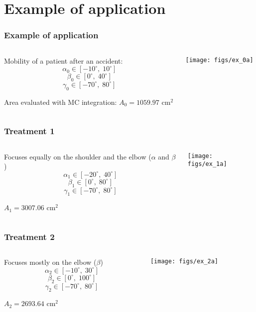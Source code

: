 \documentclass{beamer}
\begin{document}
\section{Example of application}
\begin{frame}
\frametitle{Example of application}

\begin{columns}
\begin{column}{0.55\textwidth}
Mobility of a patient after an accident:
$$
\alpha_0\in [-10^\circ, \; 10^\circ]
$$
$$ \beta_0\in [0^\circ, \; 40^\circ]
$$
$$
 \gamma_0\in [-70^\circ, \; 80^\circ]
$$

\vspace*{0.5cm}
Area evaluated with MC integration:
$A_0=1059.97$ cm$^2$
\end{column}

\begin{column}{0.45\textwidth}
\texttt{[image: figs/ex\_0a]}
\end{column}
\end{columns}

\end{frame}


\begin{frame}
\frametitle{Treatment 1}

\begin{columns}
\begin{column}{0.55\textwidth}
Focuses equally on the shoulder and the elbow ($\alpha$ and $\beta$)
$$
\alpha_1\in [-20^\circ, \; 40^\circ]
$$
$$
 \beta_1\in [0^\circ, \; 80^\circ]
 $$
 $$
  \gamma_1\in [-70^\circ, \; 80^\circ]
$$

\vspace*{0.5cm}
$A_1=3007.06$ cm$^2$
\end{column}

\begin{column}{0.45\textwidth}
\texttt{[image: figs/ex\_1a]}
\end{column}
\end{columns}

\end{frame}


\begin{frame}
\frametitle{Treatment 2}

\begin{columns}
\begin{column}{0.55\textwidth}
Focuses mostly on the elbow ($\beta$)
$$
\alpha_2\in [-10^\circ, \; 30^\circ]
$$
$$
\beta_2\in [0^\circ, \; 100^\circ]
$$
$$
 \gamma_2\in [-70^\circ, \; 80^\circ]
$$

\vspace*{0.5cm}
$A_2=2693.64$ cm$^2$
\end{column}

\begin{column}{0.45\textwidth}
\texttt{[image: figs/ex\_2a]}
\end{column}
\end{columns}

\end{frame}
\end{document}

